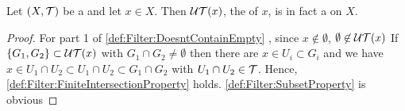 \begin{prop}
\label{prop:NeighborhoodFilter}
Let $(X,\mathcal{T})$ be a \TopologicalSpace 
and let $x \in X$. 
Then $\mathcal{U}{\mathcal{T}}(x)$, the
\NeighborhoodFilter of $x$, is in fact a 
\Filter on $X$. 
\begin{proof}
For part 1 of 
\ref{def:Filter:DoesntContainEmpty}
, since $x \not \in \emptyset$, $\emptyset \not \in\mathcal{U}{\mathcal{T}}(x)$
If $\{G_1, G_2\} \subset \mathcal{U}{\mathcal{T}}(x)$ with 
$G_1 \cap G_2 \neq \emptyset$
then there are \SetOpen $x \in U_i \subset G_i$ and we have
$x \in U_1 \cap U_2 \subset U_1 \cap U_2 \subset G_1 \cap G_2$ with 
$U_1 \cap U_2 \in \mathcal{T}$. Hence, 
\ref{def:Filter:FiniteIntersectionProperty}
holds. 
\ref{def:Filter:SubsetProperty} is obvious
\end{proof}
\end{prop}


